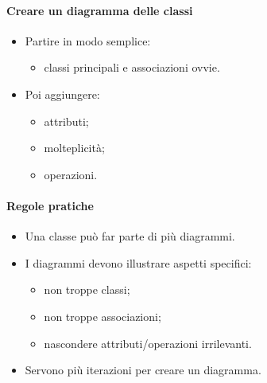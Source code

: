 \documentclass[a4paper,12pt]{article}
\begin{document}
\paragraph{Creare un diagramma delle classi}
\begin{itemize}
  \item Partire in modo semplice:
  \begin{itemize}
    \item classi principali e associazioni ovvie.
  \end{itemize}
  \item Poi aggiungere:
  \begin{itemize}
    \item attributi;
    \item molteplicità;
    \item operazioni.
  \end{itemize}
\end{itemize}
\paragraph{Regole pratiche}
\begin{itemize}
  \item Una classe può far parte di più diagrammi.
  \item I diagrammi devono illustrare aspetti specifici:
  \begin{itemize}
    \item non troppe classi;
    \item non troppe associazioni;
    \item nascondere attributi/operazioni irrilevanti.
  \end{itemize}
  \item Servono più iterazioni per creare un diagramma.
\end{itemize}
\end{document}
